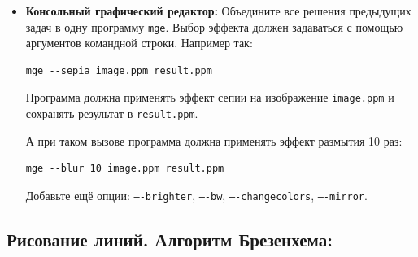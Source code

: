 \documentclass{article}
\begin{document}
\begin{itemize}

\item \textbf{Консольный графический редактор:} Объедините все решения предыдущих задач в одну программу \texttt{mge}. Выбор эффекта должен задаваться с помощью аргументов командной строки. Например так:
\begin{verbatim}
mge --sepia image.ppm result.ppm
\end{verbatim}
Программа должна применять эффект сепии на изображение \texttt{image.ppm} и сохранять результат в \texttt{result.ppm}.

А при таком вызове программа должна применять эффект размытия 10 раз:
\begin{verbatim}
mge --blur 10 image.ppm result.ppm
\end{verbatim}
Добавьте ещё опции: \texttt{----brighter}, \texttt{----bw}, \texttt{----changecolors}, \texttt{----mirror}.
\end{itemize}

\newpage
\subsection*{Рисование линий. Алгоритм Брезенхема:}
\end{document}
